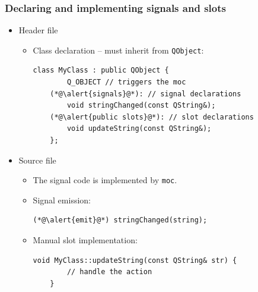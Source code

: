 \begin{frame}[fragile]
  \frametitle{Declaring and implementing signals and slots}
  \footnotesize
  \begin{itemize}
    \item Header file
    \begin{itemize}
      \item Class declaration -- must inherit from \texttt{QObject}:
        \begin{lstlisting}[basicstyle=\scriptsize\ttfamily]
	class MyClass : public QObject {
	    Q_OBJECT // triggers the moc
	(*@\alert{signals}@*): // signal declarations
	    void stringChanged(const QString&);
	(*@\alert{public slots}@*): // slot declarations
	    void updateString(const QString&); 
	};\end{lstlisting}
    \end{itemize}
    \item Source file
    \begin{itemize}
      \item The signal code is implemented by \texttt{moc}.
      \item Signal emission:
      \begin{lstlisting}[basicstyle=\scriptsize\ttfamily]
	(*@\alert{emit}@*) stringChanged(string);
	\end{lstlisting}
      \item Manual slot implementation:
      \begin{lstlisting}[basicstyle=\scriptsize\ttfamily]
	void MyClass::updateString(const QString& str) {
	    // handle the action
	}\end{lstlisting}
    \end{itemize}
  \end{itemize}
\end{frame}

